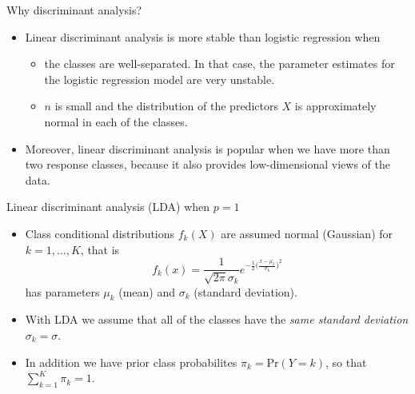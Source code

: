 \documentclass[10pt,ignorenonframetext,]{beamer}
\providecommand{\tightlist}{%
  \setlength{\itemsep}{0pt}\setlength{\parskip}{0pt}}
\begin{document}
\begin{frame}

\begin{block}{Why discriminant analysis?}

\vspace{2mm}

\begin{itemize}
\item
  Linear discriminant analysis is more stable than logistic regression
  when

  \begin{itemize}
  \tightlist
  \item
    the classes are well-separated. In that case, the parameter
    estimates for the logistic regression model are very unstable.
  \item
    \(n\) is small and the distribution of the predictors \(X\) is
    approximately normal in each of the classes.
  \end{itemize}
\end{itemize}

\vspace{2mm}

\begin{itemize}
\tightlist
\item
  Moreover, linear discriminant analysis is popular when we have more
  than two response classes, because it also provides low-dimensional
  views of the data.
\end{itemize}

\end{block}

\end{frame}

\begin{frame}{Linear discriminant analysis (LDA) when \(p=1\)}

\begin{itemize}
\item
  Class conditional distributions \(f_k(X)\) are assumed normal
  (Gaussian) for \(k=1,\ldots,K\), that is
  \[f_k(x) = \frac{1}{\sqrt{2\pi}\sigma_k} e^{-\frac{1}{2}\big(\frac{x-\mu_k}{\sigma_k}\big)^2} \]
  has parameters \(\mu_k\) (mean) and \(\sigma_k\) (standard deviation).
\item
  With LDA we assume that all of the classes have the \emph{same
  standard deviation} \(\sigma_k = \sigma\).
\item
  In addition we have prior class probabilites \(\pi_k=\text{Pr}(Y=k)\),
  so that \(\sum_{k=1}^K \pi_k=1\).
\end{itemize}

\end{frame}
\end{document}
